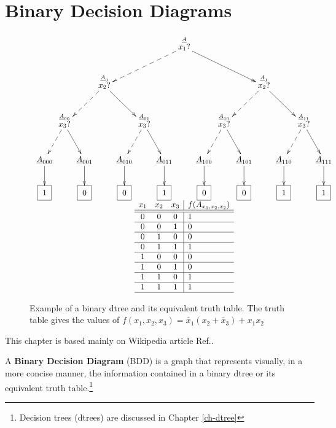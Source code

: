 \chapter{Binary Decision Diagrams}\label{ch-binarydd}

\begin{figure}[h!]
$$
\begin{array}{c}
\xymatrix@C=.1pc{
&&&&&&&\stackrel{\rvA}{x_1?}\ar@{-->}[dllll]
\ar[drrrr]
\\
&&&\stackrel{\rvA_0}{x_2?}\ar@{-->}[dll]\ar[drr]
&&&&&&&&\stackrel{\rvA_1} {x_2?}\ar@{-->}[dll]\ar[drr]
\\
&\stackrel{\rvA_{00}}{ x_3?}\ar@{-->}[dl]\ar[dr]
&&&&\stackrel{\rvA_{01}} {x_3?}\ar@{-->}[dl]\ar[dr]
&&&&\stackrel{\rvA_{10}}{ x_3?}\ar@{-->}[dl]\ar[dr]
&&&&\stackrel{\rvA_{11}}{x_3?}\ar@{-->}[dl]\ar[dr]
\\
\rvA_{000}\ar[d]
&&\rvA_{001}\ar[d]
&&\rvA_{010}\ar[d]
&&\rvA_{011}\ar[d]
&&\rvA_{100}\ar[d]
&&\rvA_{101}\ar[d]
&&\rvA_{110}\ar[d]
&&\rvA_{111}\ar[d]
\\
\Rect{1}
&&\Rect{0}
&&\Rect{0}
&&\Rect{1}
&&\Rect{0}
&&\Rect{0}
&&\Rect{1}
&&\Rect{1}
}
\\
\begin{array}{ccc|l}
x_1&x_2&x_3&f(A_{x_1,x_2,x_2})
\\ \hline\hline
0
&0
&0
&1
\\ \hline
0
&0
&1
&0
\\ \hline
0
&1
&0
&0
\\ \hline
0
&1
&1
&1
\\ \hline
1
&0
&0
&0
\\ \hline
1
&0
&1
&0
\\ \hline
1
&1
&0
&1
\\ \hline
1
&1
&1
&1
\\ \hline
\end{array}
\end{array}
$$
\caption{Example of a binary dtree and its
equivalent truth table.
The truth table gives the values of $
f(x_1, x_2,x_3)=
\bar{x}_1(x_2+\bar{x}_3)  + x_1 x_2 $ }
\label{fig-bdd-tree}
\end{figure}

This chapter is based
mainly on Wikipedia article Ref.\cite{wiki-bdd}.

A {\bf Binary Decision Diagram} (BDD) is a
graph that represents
visually, in a more concise manner,
the information contained in
a binary dtree  or
its equivalent truth table.\footnote{Decision trees (dtrees) are discussed
in Chapter \ref{ch-dtree}}

